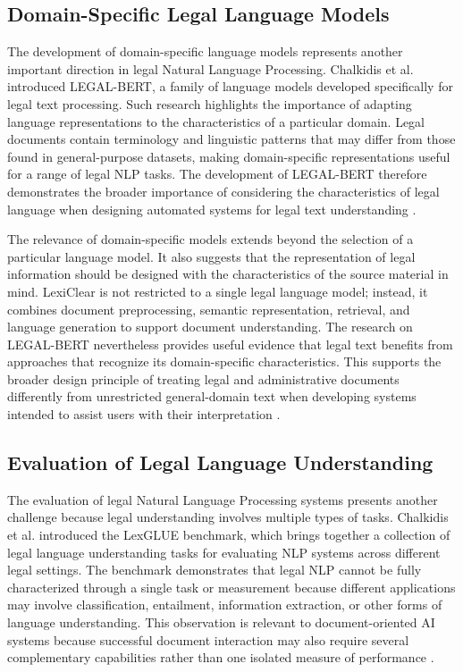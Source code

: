 \documentclass[12pt,a4paper,oneside]{report}
\begin{document}
\subsection{Domain-Specific Legal Language Models}

The development of domain-specific language models represents another
important direction in legal Natural Language Processing. Chalkidis et al.
introduced LEGAL-BERT, a family of language models developed specifically for
legal text processing. Such research highlights the importance of adapting
language representations to the characteristics of a particular domain.
Legal documents contain terminology and linguistic patterns that may differ
from those found in general-purpose datasets, making domain-specific
representations useful for a range of legal NLP tasks. The development of
LEGAL-BERT therefore demonstrates the broader importance of considering the
characteristics of legal language when designing automated systems for legal
text understanding
\cite{chalkidis2020legalbert}.

The relevance of domain-specific models extends beyond the selection of a
particular language model. It also suggests that the representation of legal
information should be designed with the characteristics of the source material
in mind. LexiClear is not restricted to a single legal language model;
instead, it combines document preprocessing, semantic representation,
retrieval, and language generation to support document understanding. The
research on LEGAL-BERT nevertheless provides useful evidence that legal text
benefits from approaches that recognize its domain-specific characteristics.
This supports the broader design principle of treating legal and
administrative documents differently from unrestricted general-domain text
when developing systems intended to assist users with their interpretation
\cite{chalkidis2020legalbert}.

\subsection{Evaluation of Legal Language Understanding}

The evaluation of legal Natural Language Processing systems presents another
challenge because legal understanding involves multiple types of tasks.
Chalkidis et al. introduced the LexGLUE benchmark, which brings together a
collection of legal language understanding tasks for evaluating NLP systems
across different legal settings. The benchmark demonstrates that legal NLP
cannot be fully characterized through a single task or measurement because
different applications may involve classification, entailment, information
extraction, or other forms of language understanding. This observation is
relevant to document-oriented AI systems because successful document
interaction may also require several complementary capabilities rather than
one isolated measure of performance
\cite{chalkidis2022lexglue}.
\end{document}
